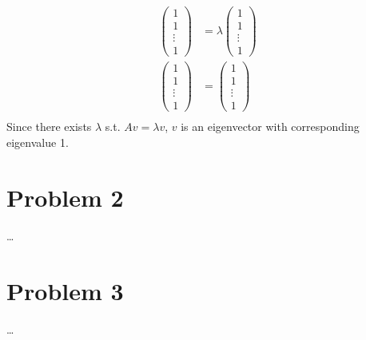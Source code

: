 \documentclass[fleqn]{article}
\begin{document}
\begin{equation*}
    \begin{split}
        \begin{pmatrix}1\\1\\ \vdots\\1\end{pmatrix}&=\lambda \begin{pmatrix}1\\1\\ \vdots\\1\end{pmatrix}\\
        \begin{pmatrix}1\\1\\ \vdots\\1\end{pmatrix}&= \begin{pmatrix}1\\1\\ \vdots\\1\end{pmatrix}\\
    \end{split}
\end{equation*}
Since there exists $\lambda$ s.t. $Av=\lambda v$, $v$ is an eigenvector with corresponding eigenvalue 1.
\section*{Problem 2}
\dots %
\section*{Problem 3}
\dots %
\end{document}
